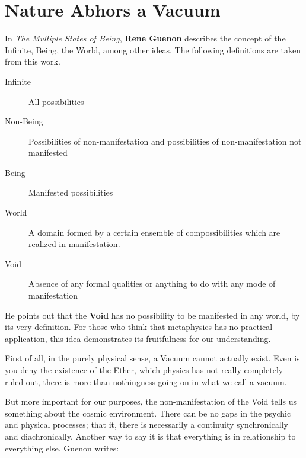 \section{Nature Abhors a Vacuum}

In \emph{The Multiple States of Being}, \textbf{Rene Guenon} describes the concept of the Infinite, Being, the World, among other ideas. The following definitions are taken from this work.

\begin{description}
\item[Infinite ]

All possibilities 

\item[Non-Being ]

Possibilities of non-manifestation and possibilities of non-manifestation not manifested 

\item[Being ]

Manifested possibilities 

\item[World ]

A domain formed by a certain ensemble of compossibilities which are realized in manifestation. 

\item[Void ]

Absence of any formal qualities or anything to do with any mode of manifestation 

\end{description}
He points out that the \textbf{Void} has no possibility to be manifested in any world, by its very definition. For those who think that metaphysics has no practical application, this idea demonstrates its fruitfulness for our understanding.

First of all, in the purely physical sense, a Vacuum cannot actually exist. Even is you deny the existence of the Ether, which physics has not really completely ruled out, there is more than nothingness going on in what we call a vacuum.

But more important for our purposes, the non-manifestation of the Void tells us something about the cosmic environment. There can be no gaps in the psychic and physical processes; that it, there is necessarily a continuity synchronically and diachronically. Another way to say it is that everything is in relationship to everything else. Guenon writes:

